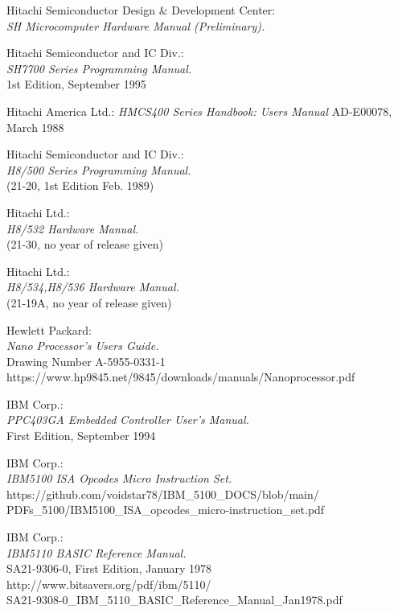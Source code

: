  Hitachi Semiconductor Design \& Development Center: \\
                 {\em SH Microcomputer Hardware Manual
                 (Preliminary).\/}

 Hitachi Semiconductor and IC Div.: \\
                 {\em SH7700 Series Programming Manual.\/} \\
                 1st Edition, September 1995

 Hitachi America Ltd.:
                 {\em HMCS400 Series Handbook: Users Manual\/}
                 AD-E00078, March 1988

 Hitachi Semiconductor and IC Div.: \\
                  {\em H8/500 Series Programming Manual.\/} \\
        	  (21-20, 1st Edition Feb. 1989)

 Hitachi Ltd.: \\
                    {\em H8/532 Hardware Manual.\/} \\
		    (21-30, no year of release given)

 Hitachi Ltd.: \\
                    {\em H8/534,H8/536 Hardware Manual.\/} \\
		    (21-19A, no year of release given)

 Hewlett Packard: \\
                 { \em Nano Processor's Users Guide.\/} \\
                 Drawing Number A-5955-0331-1 \\
                 https://www.hp9845.net/9845/downloads/manuals/Nanoprocessor.pdf

 IBM Corp.: \\
	         {\em PPC403GA Embedded Controller User's Manual.\/} \\
                 First Edition, September 1994

 IBM Corp.: \\
                 {\em IBM5100 ISA Opcodes Micro Instruction Set.\/} \\
                 https://github.com/voidstar78/IBM\_5100\_DOCS/blob/main/ \\
                 PDFs\_5100/IBM5100\_ISA\_opcodes\_micro-instruction\_set.pdf

 IBM Corp.: \\
                 {\em IBM5110 BASIC Reference Manual.\/} \\
                 SA21-9306-0, First Edition, January 1978 \\
                 http://www.bitsavers.org/pdf/ibm/5110/ \\
                 SA21-9308-0\_IBM\_5110\_BASIC\_Reference\_Manual\_Jan1978.pdf

